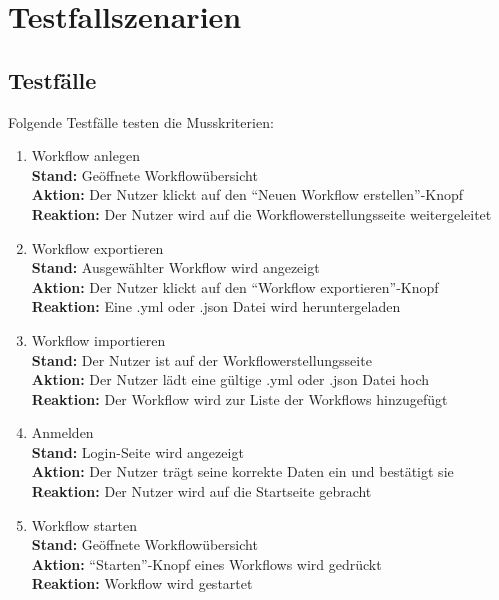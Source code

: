 \chapter{Testfallszenarien}

\section{Testfälle}
Folgende Testfälle testen die Musskriterien:
\renewcommand{\labelenumi}{/T\arabic{enumi}0/}
\begin{enumerate}
    \item Workflow anlegen
    \\ \textbf{Stand:} Geöffnete Workflowübersicht
    \\ \textbf{Aktion:} Der \Gls{Nutzer} klickt auf den \enquote{Neuen Workflow erstellen}-Knopf
    \\ \textbf{Reaktion:} Der \Gls{Nutzer} wird auf die Workflowerstellungsseite weitergeleitet
    \item Workflow exportieren 
    \\ \textbf{Stand:} Ausgewählter Workflow wird angezeigt
    \\ \textbf{Aktion:} Der \gls{Nutzer} klickt auf den \enquote{Workflow exportieren}-Knopf
    \\ \textbf{Reaktion:} Eine .yml oder .json Datei wird heruntergeladen
    \item Workflow importieren 
    \\ \textbf{Stand:} Der \gls{Nutzer} ist auf der Workflowerstellungsseite 
    \\ \textbf{Aktion:} Der \gls{Nutzer} lädt eine gültige .yml oder .json Datei hoch 
    \\ \textbf{Reaktion:} Der Workflow wird zur Liste der Workflows hinzugefügt
    \item Anmelden
    \\ \textbf{Stand:} Login-Seite wird angezeigt
    \\ \textbf{Aktion:} Der \gls{Nutzer} trägt seine korrekte Daten ein und bestätigt sie
    \\ \textbf{Reaktion:} Der \gls{Nutzer} wird auf die Startseite gebracht
    \item Workflow starten
    \\ \textbf{Stand:} Geöffnete Workflowübersicht 
    \\ \textbf{Aktion:} \enquote{Starten}-Knopf eines Workflows wird gedrückt
    \\ \textbf{Reaktion:} Workflow wird gestartet

\end{enumerate}

